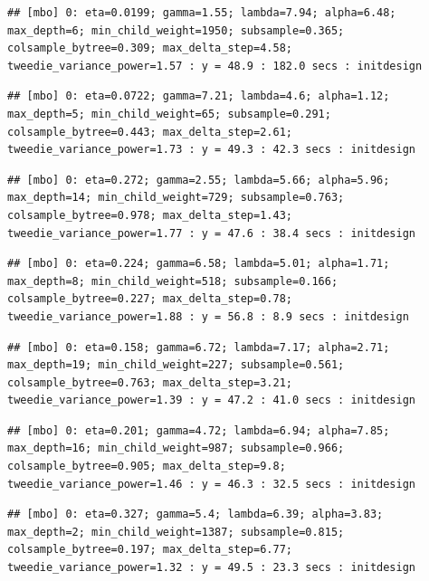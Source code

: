 \documentclass[
]{article}
\begin{document}
\begin{verbatim}
## [mbo] 0: eta=0.0199; gamma=1.55; lambda=7.94; alpha=6.48; max_depth=6; min_child_weight=1950; subsample=0.365; colsample_bytree=0.309; max_delta_step=4.58; tweedie_variance_power=1.57 : y = 48.9 : 182.0 secs : initdesign
\end{verbatim}

\begin{verbatim}
## [mbo] 0: eta=0.0722; gamma=7.21; lambda=4.6; alpha=1.12; max_depth=5; min_child_weight=65; subsample=0.291; colsample_bytree=0.443; max_delta_step=2.61; tweedie_variance_power=1.73 : y = 49.3 : 42.3 secs : initdesign
\end{verbatim}

\begin{verbatim}
## [mbo] 0: eta=0.272; gamma=2.55; lambda=5.66; alpha=5.96; max_depth=14; min_child_weight=729; subsample=0.763; colsample_bytree=0.978; max_delta_step=1.43; tweedie_variance_power=1.77 : y = 47.6 : 38.4 secs : initdesign
\end{verbatim}

\begin{verbatim}
## [mbo] 0: eta=0.224; gamma=6.58; lambda=5.01; alpha=1.71; max_depth=8; min_child_weight=518; subsample=0.166; colsample_bytree=0.227; max_delta_step=0.78; tweedie_variance_power=1.88 : y = 56.8 : 8.9 secs : initdesign
\end{verbatim}

\begin{verbatim}
## [mbo] 0: eta=0.158; gamma=6.72; lambda=7.17; alpha=2.71; max_depth=19; min_child_weight=227; subsample=0.561; colsample_bytree=0.763; max_delta_step=3.21; tweedie_variance_power=1.39 : y = 47.2 : 41.0 secs : initdesign
\end{verbatim}

\begin{verbatim}
## [mbo] 0: eta=0.201; gamma=4.72; lambda=6.94; alpha=7.85; max_depth=16; min_child_weight=987; subsample=0.966; colsample_bytree=0.905; max_delta_step=9.8; tweedie_variance_power=1.46 : y = 46.3 : 32.5 secs : initdesign
\end{verbatim}

\begin{verbatim}
## [mbo] 0: eta=0.327; gamma=5.4; lambda=6.39; alpha=3.83; max_depth=2; min_child_weight=1387; subsample=0.815; colsample_bytree=0.197; max_delta_step=6.77; tweedie_variance_power=1.32 : y = 49.5 : 23.3 secs : initdesign
\end{verbatim}
\end{document}
